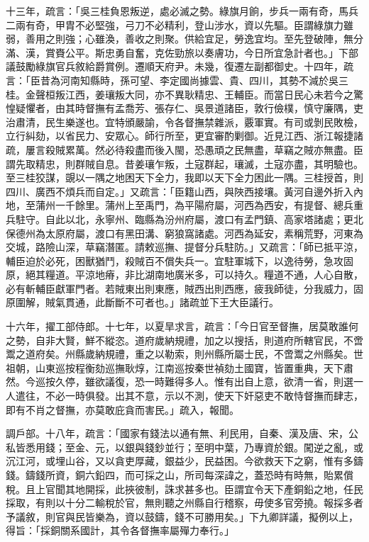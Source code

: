 \begin{pinyinscope}
十三年，疏言：「吳三桂負恩叛逆，處必滅之勢。綠旗月餉，步兵一兩有奇，馬兵二兩有奇，甲胄不必堅強，弓刀不必精利，登山涉水，資以先驅。臣謂綠旗力雖弱，善用之則強；心雖渙，善收之則聚。供給宜足，勞逸宜均。至先登破陣，無分滿、漢，賞賚公平。斯忠勇自奮，克佐勁旅以奏膚功，今日所宜急計者也。」下部議鼓勵綠旗官兵敘給爵賞例。遷順天府尹。未幾，復遷左副都御史。十四年，疏言：「臣昔為河南知縣時，孫可望、李定國尚據雲、貴、四川，其勢不減於吳三桂。金聲桓叛江西，姜瓖叛大同，亦不異耿精忠、王輔臣。而當日民心未若今之驚惶疑懼者，由其時督撫有孟喬芳、張存仁、吳景道諸臣，敦行儉樸，慎守廉隅，吏治肅清，民生樂遂也。宜特頒嚴諭，令各督撫禁雜派，覈軍實。有司或剝民敗檢，立行糾劾，以省民力、安眾心。師行所至，更宜審酌剿御。近見江西、浙江報捷諸疏，屢言殺賊累萬。然必待殺盡而後入閩，恐愚頑之民無盡，草竊之賊亦無盡。臣謂先取精忠，則群賊自息。昔姜瓖乍叛，土寇群起，瓖滅，土寇亦盡，其明驗也。至三桂狡謀，覬以一隅之地困天下全力，我即以天下全力困此一隅。三桂授首，則四川、廣西不煩兵而自定。」又疏言：「臣籍山西，與陜西接壤。黃河自邊外折入內地，至蒲州一千餘里。蒲州上至禹門，為平陽府屬，河西為西安，有提督、總兵重兵駐守。自此以北，永寧州、臨縣為汾州府屬，渡口有孟門鎮、高家塔諸處；更北保德州為太原府屬，渡口有黑田溝、窮狼窩諸處。河西為延安，素稱荒野，河東為交城，路險山深，草竊潛匿。請敕巡撫、提督分兵駐防。」又疏言：「師已抵平涼，輔臣迫於必死，困獸猶鬥，殺賊百不償失兵一。宜駐軍城下，以逸待勞，急攻固原，絕其糧道。平涼地瘠，非比湖南地廣米多，可以持久。糧道不通，人心自散，必有斬輔臣獻軍門者。若賊東出則東應，賊西出則西應，疲我師徒，分我威力，固原圍解，賊氣貫通，此斷斷不可者也。」諸疏並下王大臣議行。

十六年，擢工部侍郎。十七年，以夏旱求言，疏言：「今日官至督撫，居莫敢誰何之勢，自非大賢，鮮不縱恣。道府歲納規禮，加之以搜括，則道府所轄官民，不啻鬻之道府矣。州縣歲納規禮，重之以勒索，則州縣所屬士民，不啻鬻之州縣矣。世祖朝，山東巡按程衡劾巡撫耿焞，江南巡按秦世禎劾土國寶，皆置重典，天下肅然。今巡按久停，雖欲議復，恐一時難得多人。惟有出自上意，欲清一省，則選一人遣往，不必一時俱發。出其不意，示以不測，使天下奸惡吏不敢恃督撫而肆志，即有不肖之督撫，亦莫敢庇貪而害民。」疏入，報聞。

調戶部。十八年，疏言：「國家有錢法以通有無、利民用，自秦、漢及唐、宋，公私皆悉用錢；至金、元，以銀與錢鈔並行；至明中葉，乃專資於銀。闖逆之亂，或沉江河，或埋山谷，又以貪吏厚藏，銀益少，民益困。今欲救天下之窮，惟有多鑄錢。鑄錢所資，銅六鉛四，而可採之山，所司每深諱之，蓋恐時有時無，貽累償稅。且上官聞其地開採，此挾彼制，誅求甚多也。臣謂宜令天下產銅鉛之地，任民採取，有則以十分二輸稅於官，無則聽之州縣自行稽察，毋使多官旁撓。報採多者予議敘，則官與民皆樂為，資以鼓鑄，錢不可勝用矣。」下九卿詳議，擬例以上，得旨：「採銅關系國計，其令各督撫率屬殫力奉行。」


\end{pinyinscope}
